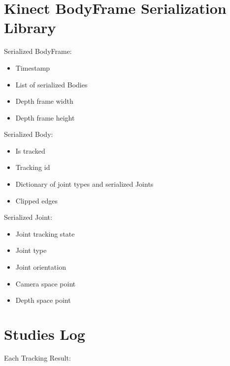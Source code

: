 \newpage
\begin{appendices}

\section{Kinect BodyFrame Serialization Library}
\label{sec:bodyframe_serialization}

Serialized BodyFrame:

\begin{itemize}
  \item Timestamp
  \item List of serialized Bodies
  \item Depth frame width
  \item Depth frame height
\end{itemize}

Serialized Body:

\begin{itemize}
  \item Is tracked
  \item Tracking id
  \item Dictionary of joint types and serialized Joints
  \item Clipped edges
\end{itemize}

Serialized Joint:

\begin{itemize}
  \item Joint tracking state
  \item Joint type
  \item Joint orientation
  \item Camera space point
  \item Depth space point
\end{itemize}

\section{Studies Log}
\label{sec:logging}

Each Tracking Result:


\end{appendices}
